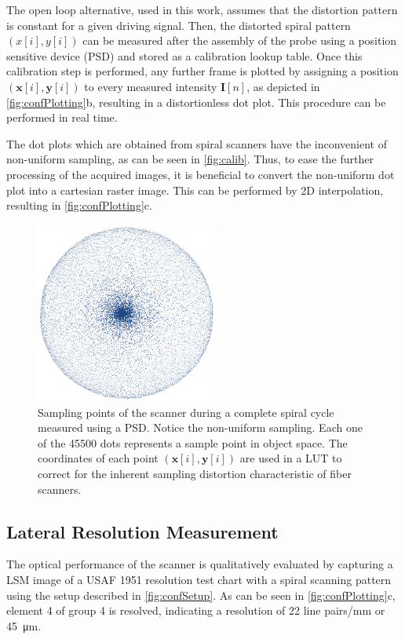 The open loop alternative, used in this work, assumes that the distortion pattern is constant for a given driving signal. Then, the distorted spiral pattern $(x[i], y[i])$ can be measured after the assembly of the probe using a position sensitive device (PSD) and stored as a calibration lookup table.
Once this calibration step is performed, any further frame is plotted by assigning a position $(\mathbf{x}[i], \mathbf{y}[i])$ to every measured intensity $\mathbf{I}[n]$, as depicted in \autoref{fig:confPlotting}b, resulting in a distortionless dot plot. This procedure can be performed in real time.

The dot plots which are obtained from spiral scanners have the inconvenient of non-uniform sampling, as can be seen in \autoref{fig:calib}. Thus, to ease the further processing of the acquired images, it is beneficial to convert the non-uniform dot plot into a cartesian raster image. This can be performed by 2D interpolation, resulting in \autoref{fig:confPlotting}c.


\begin{figure}[h!]\centering \includegraphics[width=6cm]{figures/50_Measurements/conf/proc/samplingDensity.png}
      \caption{Sampling points of the scanner during a complete spiral cycle measured using a PSD. Notice the non-uniform sampling. Each one of the 45500 dots represents a sample point in object space. The coordinates of each point $(\mathbf{x}[i], \mathbf{y}[i])$ are used in a LUT to correct for the inherent sampling distortion characteristic of fiber scanners.}
      \label{fig:calib}
\end{figure}


\subsection{Lateral Resolution Measurement}
The optical performance of the scanner is qualitatively evaluated by capturing a LSM image of a USAF 1951 resolution test chart with a spiral scanning pattern using the setup described in \autoref{fig:confSetup}. As can be seen in \autoref{fig:confPlotting}c, element 4 of group 4 is resolved, indicating a resolution of 22 line pairs/mm or \SI{45}{\micro\meter}. 

